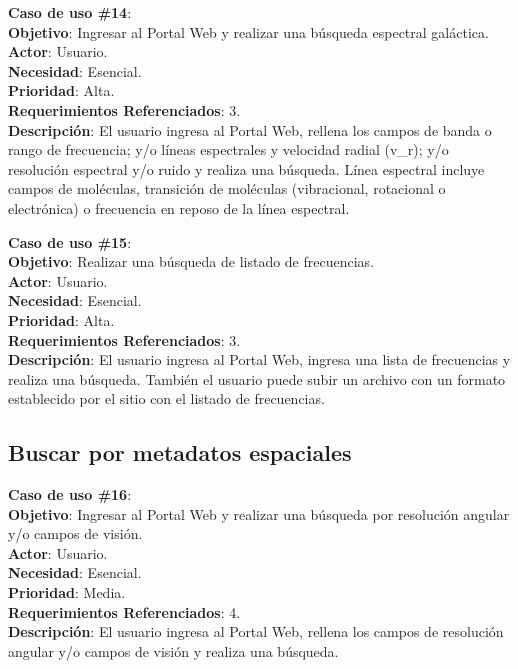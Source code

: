 \noindent\textbf{Caso de uso \#14}: \\
\textbf{Objetivo}: Ingresar al Portal Web y realizar una búsqueda espectral galáctica. \\
\textbf{Actor}: Usuario.\\
\textbf{Necesidad}: Esencial.\\
\textbf{Prioridad}: Alta.\\
\textbf{Requerimientos Referenciados}: 3. \\
\textbf{Descripción}: El usuario ingresa al Portal Web, rellena los campos de banda o rango de frecuencia;  y/o líneas espectrales y velocidad radial (v\_r); y/o resolución espectral y/o ruido y realiza una búsqueda.  Línea espectral incluye campos de moléculas, transición de moléculas (vibracional, rotacional o electrónica) o frecuencia en reposo de la línea espectral.
\vspace{1.0cm}

\noindent\textbf{Caso de uso \#15}: \\
\textbf{Objetivo}: Realizar una búsqueda de listado de frecuencias. \\
\textbf{Actor}: Usuario.\\
\textbf{Necesidad}: Esencial.\\
\textbf{Prioridad}: Alta.\\
\textbf{Requerimientos Referenciados}: 3. \\
\textbf{Descripción}: El usuario ingresa al Portal Web, ingresa una lista de frecuencias y realiza una búsqueda. También el usuario puede subir un archivo con un formato establecido por el sitio con el listado de frecuencias.
\vspace{1.0cm}

\subsection{Buscar por metadatos espaciales}
\noindent\textbf{Caso de uso \#16}: \\
\textbf{Objetivo}: Ingresar al Portal Web y realizar una búsqueda por resolución angular y/o campos de visión. \\
\textbf{Actor}: Usuario.\\
\textbf{Necesidad}: Esencial.\\
\textbf{Prioridad}: Media.\\
\textbf{Requerimientos Referenciados}: 4. \\
\textbf{Descripción}: El usuario ingresa al Portal Web, rellena los campos de resolución angular y/o campos de visión y realiza una búsqueda.
\vspace{1.0cm}

